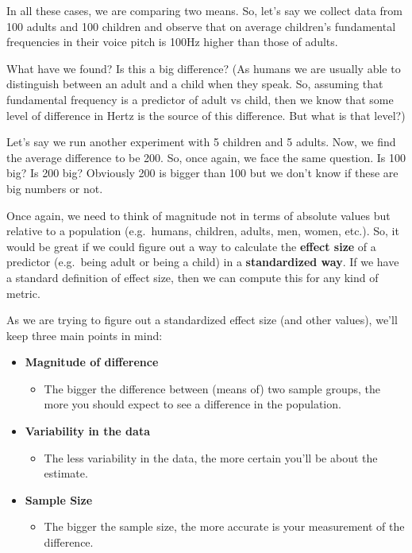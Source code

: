 \documentclass[
]{book}
\providecommand{\tightlist}{%
  \setlength{\itemsep}{0pt}\setlength{\parskip}{0pt}}
\begin{document}
In all these cases, we are comparing two means. So, let's say we collect data from 100 adults and 100 children and observe that on average children's fundamental frequencies in their voice pitch is 100Hz higher than those of adults.

What have we found? Is this a big difference? (As humans we are usually able to distinguish between an adult and a child when they speak. So, assuming that fundamental frequency is a predictor of adult vs child, then we know that some level of difference in Hertz is the source of this difference. But what is that level?)

Let's say we run another experiment with 5 children and 5 adults. Now, we find the average difference to be 200. So, once again, we face the same question. Is 100 big? Is 200 big? Obviously 200 is bigger than 100 but we don't know if these are big numbers or not.

Once again, we need to think of magnitude not in terms of absolute values but relative to a population (e.g.~humans, children, adults, men, women, etc.). So, it would be great if we could figure out a way to calculate the \textbf{effect size} of a predictor (e.g.~being adult or being a child) in a \textbf{standardized way}. If we have a standard definition of effect size, then we can compute this for any kind of metric.

As we are trying to figure out a standardized effect size (and other values), we'll keep three main points in mind:

\begin{itemize}
\tightlist
\item
  \textbf{Magnitude of difference}

  \begin{itemize}
  \tightlist
  \item
    The bigger the difference between (means of) two sample groups, the more you should expect to see a difference in the population.
  \end{itemize}
\item
  \textbf{Variability in the data}

  \begin{itemize}
  \tightlist
  \item
    The less variability in the data, the more certain you'll be about the estimate.
  \end{itemize}
\item
  \textbf{Sample Size}

  \begin{itemize}
  \tightlist
  \item
    The bigger the sample size, the more accurate is your measurement of the difference.
  \end{itemize}
\end{itemize}
\end{document}
